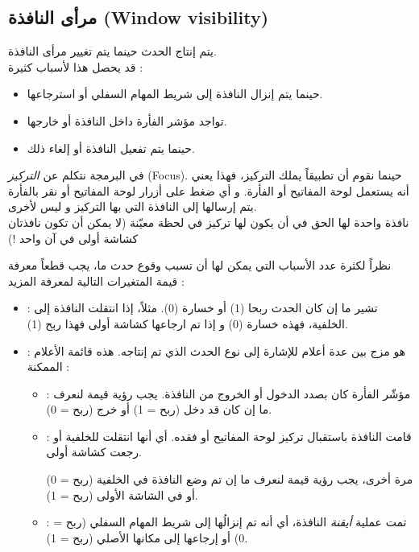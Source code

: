 \subsection{مرأى النافذة (\textenglish{Window visibility})}

يتم إنتاج الحدث
حينما يتم تغيير مرأى النافذة.\\
قد يحصل هذا لأسباب كثيرة :

\begin{itemize}
	\item حينما يتم إنزال النافذة إلى شريط المهام السفلي أو استرجاعها.
	\item تواجد مؤشر الفأرة داخل النافذة أو خارجها.
	\item حينما يتم تفعيل النافذة أو إلغاء ذلك.
\end{itemize}

\begin{information}
في البرمجة نتكلم عن
\textit{التركيز}
(\textenglish{Focus}).
حينما نقوم أن تطبيقاً يملك التركيز، فهذا يعني أنه يستعمل لوحة المفاتيح أو الفأرة. و أي ضغط على أزرار لوحة المفاتيح أو نقر بالفأرة يتم إرسالها إلى النافذة التي بها التركيز و ليس لأخرى.\\
نافذة واحدة لها الحق في أن يكون لها تركيز في لحظة معيّنة (لا يمكن أن تكون نافذتان كشاشة أولى في آن واحد !)
\end{information}

نظراً لكثرة عدد الأسباب التي يمكن لها أن تسبب وقوع حدث ما، يجب قطعاً معرفة قيمة المتغيرات التالية لمعرفة المزيد :

\begin{itemize}
	\item {} :
تشير ما إن كان الحدث ربحا (1) أو خسارة (0). مثلاً، إذا انتقلت النافذة إلى الخلفية، فهذه خسارة (0) و إذا تم ارجاعها كشاشة أولى فهذا ربح (1).
	\item {} :
	هو مزج بين عدة أعلام للإشارة إلى نوع الحدث الذي تم إنتاجه. هذه قائمة الأعلام الممكنة :
	\begin{itemize}
		\item {} :
		مؤشّر الفأرة كان بصدد الدخول أو الخروج من النافذة. 
		يجب رؤية قيمة
		لنعرف ما إن كان قد دخل (ربح = 1) أو خرج (ربح = 0).
		\item {} :
		قامت النافذة باستقبال تركيز لوحة المفاتيح أو فقده. أي أنها انتقلت للخلفية أو رجعت كشاشة أولى.
		
		مرة أخرى، يجب رؤية قيمة 
		لنعرف ما إن تم وضع النافذة في الخلفية (ربح = 0) أو في الشاشة الأولى (ربح = 1).
		\item {} :
		تمت عملية
		\textit{أيقنة}
		النافذة، أي أنه تم إنزالُها إلى شريط المهام السفلي (ربح = 0) أو إرجاعها إلى مكانها الأصلي (ربح = 1).
	\end{itemize}
\end{itemize}

